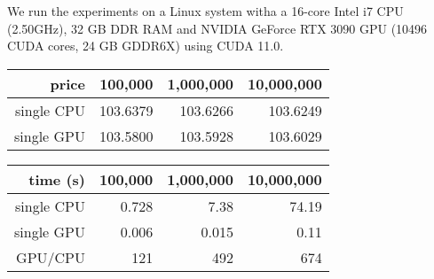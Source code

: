 We run the experiments on a Linux system witha a 16-core Intel i7 CPU (2.50GHz),
32 GB DDR RAM and NVIDIA GeForce RTX 3090 GPU (10496 CUDA cores, 24 GB GDDR6X) using
CUDA 11.0.


\begin{table*}
\begin{tabular}{r|r|r|r}
\hline\hline
price  & 100,000 & 1,000,000 & 10,000,000 \\ 
\hline
single CPU & 103.6379 & 103.6266 & 103.6249 \\
\hline
single GPU & 103.5800 & 103.5928 & 103.6029 \\ 
\hline
\end{tabular}
\end{table*}


\begin{table*}
\begin{tabular}{r|r|r|r}
\hline\hline
time (s) & 100,000 & 1,000,000 & 10,000,000 \\ 
\hline
single CPU & 0.728 & 7.38 & 74.19 \\
\hline
single GPU & 0.006 & 0.015 & 0.11 \\ 
\hline
GPU/CPU &  121 & 492 & 674 \\
\hline
\end{tabular}
\end{table*}


